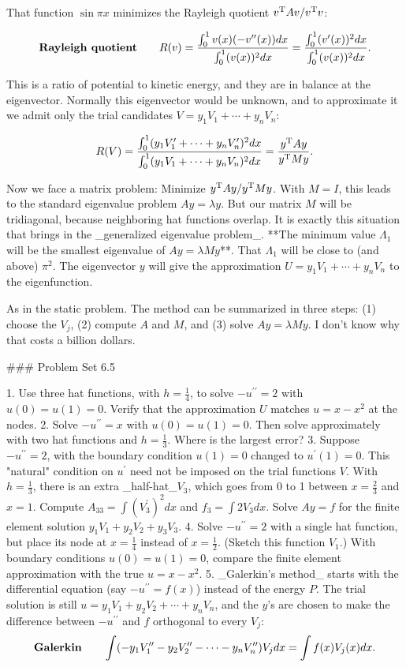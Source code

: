 That function \(\sin\pi x\) minimizes the Rayleigh quotient \(v^{\rm T}Av/v^{\rm T}v\):

\[\mbox{\bf Rayleigh quotient}\qquad R(v)=\frac{\int_{0}^{1}v(x)(-v^{\prime\prime}(x ))dx}{\int_{0}^{1}(v(x))^{2}dx}=\frac{\int_{0}^{1}(v^{\prime}(x))^{2}dx}{\int_ {0}^{1}(v(x))^{2}dx}.\]

This is a ratio of potential to kinetic energy, and they are in balance at the eigenvector. Normally this eigenvector would be unknown, and to approximate it we admit only the trial candidates \(V=y_{1}V_{1}+\cdots+y_{n}V_{n}\):

\[R(V)=\frac{\int_{0}^{1}(y_{1}V_{1}^{\prime}+\cdots+y_{n}V_{n}^{\prime})^{2}dx} {\int_{0}^{1}(y_{1}V_{1}+\cdots+y_{n}V_{n})^{2}dx}=\frac{y^{\rm T}Ay}{y^{\rm T} My}.\]

Now we face a matrix problem: Minimize \(y^{\rm T}Ay/y^{\rm T}My\). With \(M=I\), this leads to the standard eigenvalue problem \(Ay=\lambda y\). But our matrix \(M\) will be tridiagonal, because neighboring hat functions overlap. It is exactly this situation that brings in the _generalized eigenvalue problem_. **The minimum value \(\Lambda_{1}\) will be the smallest eigenvalue of \(Ay=\lambda My\)**. That \(\Lambda_{1}\) will be close to (and above) \(\pi^{2}\). The eigenvector \(y\) will give the approximation \(U=y_{1}V_{1}+\cdots+y_{n}V_{n}\) to the eigenfunction.

As in the static problem. The method can be summarized in three steps: (1) choose the \(V_{j}\), (2) compute \(A\) and \(M\), and (3) solve \(Ay=\lambda My\). I don't know why that costs a billion dollars.

### Problem Set 6.5

1. Use three hat functions, with \(h=\frac{1}{4}\), to solve \(-u^{\prime\prime}=2\) with \(u(0)=u(1)=0\). Verify that the approximation \(U\) matches \(u=x-x^{2}\) at the nodes.
2. Solve \(-u^{\prime\prime}=x\) with \(u(0)=u(1)=0\). Then solve approximately with two hat functions and \(h=\frac{1}{3}\). Where is the largest error?
3. Suppose \(-u^{\prime\prime}=2\), with the boundary condition \(u(1)=0\) changed to \(u^{\prime}(1)=0\). This "natural" condition on \(u^{\prime}\) need not be imposed on the trial functions \(V\). With \(h=\frac{1}{3}\), there is an extra _half-hat_\(V_{3}\), which goes from 0 to 1 between \(x=\frac{2}{3}\) and \(x=1\). Compute \(A_{33}=\int(V_{3}^{\prime})^{2}dx\) and \(f_{3}=\int 2V_{3}dx\). Solve \(Ay=f\) for the finite element solution \(y_{1}V_{1}+y_{2}V_{2}+y_{3}V_{3}\).
4. Solve \(-u^{\prime\prime}=2\) with a single hat function, but place its node at \(x=\frac{1}{4}\) instead of \(x=\frac{1}{2}\). (Sketch this function \(V_{1}\).) With boundary conditions \(u(0)=u(1)=0\), compare the finite element approximation with the true \(u=x-x^{2}\).
5. _Galerkin's method_ starts with the differential equation (say \(-u^{\prime\prime}=f(x)\)) instead of the energy \(P\). The trial solution is still \(u=y_{1}V_{1}+y_{2}V_{2}+\cdots+y_{n}V_{n}\), and the \(y\)'s are chosen to make the difference between \(-u^{\prime\prime}\) and \(f\) orthogonal to every \(V_{j}\): \[\mbox{\bf Galerkin}\qquad\int(-y_{1}V_{1}^{\prime\prime}-y_{2}V_{2}^{\prime \prime}-\cdots-y_{n}V_{n}^{\prime\prime})V_{j}dx=\int f(x)V_{j}(x)dx.\] 